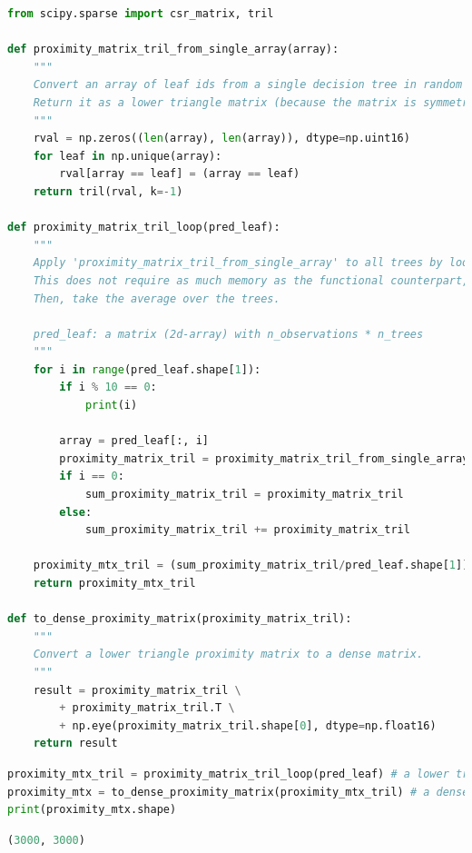 \documentclass{article}
\begin{document}
\begin{lstlisting}[language=Python]
from scipy.sparse import csr_matrix, tril

def proximity_matrix_tril_from_single_array(array):
    """
    Convert an array of leaf ids from a single decision tree in random forest to a proximity matrix.
    Return it as a lower triangle matrix (because the matrix is symmetric. This is to reduce the memory use).
    """
    rval = np.zeros((len(array), len(array)), dtype=np.uint16)
    for leaf in np.unique(array):
        rval[array == leaf] = (array == leaf)
    return tril(rval, k=-1)

def proximity_matrix_tril_loop(pred_leaf):
    """
    Apply 'proximity_matrix_tril_from_single_array' to all trees by loop.
    This does not require as much memory as the functional counterpart, but takes longer time to complete.
    Then, take the average over the trees.
    
    pred_leaf: a matrix (2d-array) with n_observations * n_trees
    """
    for i in range(pred_leaf.shape[1]):
        if i % 10 == 0:
            print(i)

        array = pred_leaf[:, i]
        proximity_matrix_tril = proximity_matrix_tril_from_single_array(array)
        if i == 0:
            sum_proximity_matrix_tril = proximity_matrix_tril
        else:
            sum_proximity_matrix_tril += proximity_matrix_tril
            
    proximity_mtx_tril = (sum_proximity_matrix_tril/pred_leaf.shape[1]).astype(np.float16)
    return proximity_mtx_tril

def to_dense_proximity_matrix(proximity_matrix_tril):
    """
    Convert a lower triangle proximity matrix to a dense matrix.
    """
    result = proximity_matrix_tril \
        + proximity_matrix_tril.T \
        + np.eye(proximity_matrix_tril.shape[0], dtype=np.float16)
    return result
\end{lstlisting}

\begin{lstlisting}[language=Python]
proximity_mtx_tril = proximity_matrix_tril_loop(pred_leaf) # a lower triangle matrix
proximity_mtx = to_dense_proximity_matrix(proximity_mtx_tril) # a dense matrix
print(proximity_mtx.shape)
\end{lstlisting}

\begin{lstlisting}[language=Python,numbers=none]
(3000, 3000)
\end{lstlisting}
\end{document}
